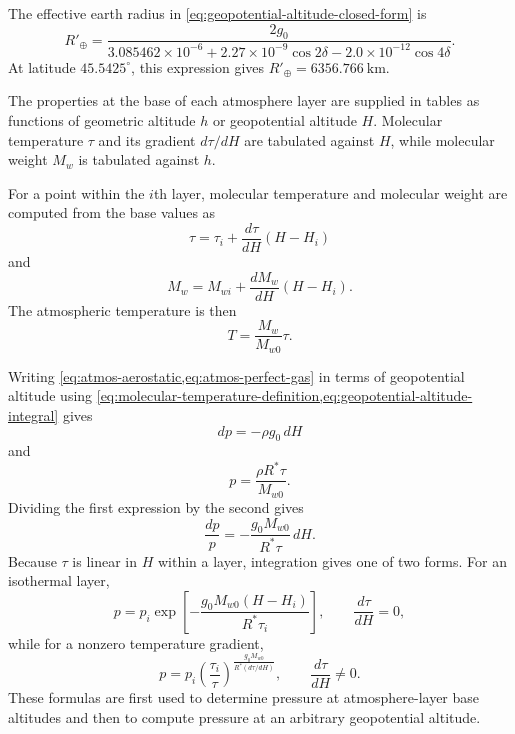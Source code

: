 The effective earth radius in \cref{eq:geopotential-altitude-closed-form} is
\begin{equation}
  R'_{\oplus}
  =\frac{2g_0}
  {3.085462\times10^{-6}
   +2.27\times10^{-9}\cos 2\delta
   -2.0\times10^{-12}\cos 4\delta}.
  \label{eq:effective-geopotential-earth-radius}
\end{equation}
At latitude $45.5425^\circ$, this expression gives
$R'_{\oplus}=6356.766\ \mathrm{km}$.

The properties at the base of each atmosphere layer are supplied in tables as
functions of geometric altitude $h$ or geopotential altitude $H$. Molecular
temperature $\tau$ and its gradient $d\tau/dH$ are tabulated against $H$, while
molecular weight $M_w$ is tabulated against $h$.


For a point within the $i$th layer, molecular temperature and molecular weight are
computed from the base values as
\begin{equation}
  \tau=\tau_i+\frac{d\tau}{dH}\left(H-H_i\right)
  \label{eq:layer-molecular-temperature}
\end{equation}
and
\begin{equation}
  M_w=M_{wi}+\frac{dM_w}{dH}\left(H-H_i\right).
  \label{eq:layer-molecular-weight}
\end{equation}
The atmospheric temperature is then
\begin{equation}
  T=\frac{M_w}{M_{w0}}\tau.
  \label{eq:atmos-temperature}
\end{equation}


Writing \cref{eq:atmos-aerostatic,eq:atmos-perfect-gas} in terms of geopotential
altitude using \cref{eq:molecular-temperature-definition,eq:geopotential-altitude-integral}
gives
\begin{equation}
  dp=-\rho g_0\,dH
  \label{eq:pressure-geopotential-differential}
\end{equation}
and
\begin{equation}
  p=\frac{\rho R^*\tau}{M_{w0}}.
  \label{eq:pressure-molecular-temperature}
\end{equation}
Dividing the first expression by the second gives
\begin{equation}
  \frac{dp}{p}
  =-\frac{g_0M_{w0}}{R^*\tau}\,dH.
  \label{eq:pressure-separable-differential}
\end{equation}
Because $\tau$ is linear in $H$ within a layer, integration gives one of two forms.
For an isothermal layer,
\begin{equation}
  p=p_i\exp\left[-\frac{g_0M_{w0}(H-H_i)}{R^*\tau_i}\right],
  \qquad \frac{d\tau}{dH}=0,
  \label{eq:pressure-isothermal-layer}
\end{equation}
while for a nonzero temperature gradient,
\begin{equation}
  p=p_i
  \left(\frac{\tau_i}{\tau}\right)^{
    \frac{g_0M_{w0}}{R^*\left(d\tau/dH\right)}},
  \qquad \frac{d\tau}{dH}\ne0.
  \label{eq:pressure-gradient-layer}
\end{equation}
These formulas are first used to determine pressure at atmosphere-layer base
altitudes and then to compute pressure at an arbitrary geopotential altitude.

